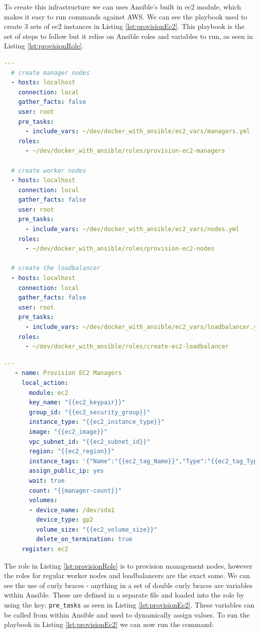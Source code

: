 \documentclass{article}
\begin{document}
To create this infrastructure we can uses Ansible's built in ec2 module, which makes it easy to run commands against AWS. We can see the playbook used to create 3 sets of ec2 instances in Listing \ref{lst:provisionEc2}. This playbook is the set of steps to follow but it relies on Ansible roles and variables to run, as seen in Listing \ref{lst:provisionRole}.

\begin{lstlisting}[float,floatplacement=!htbp,language=yaml,caption={create-instances.yml},label={lst:provisionEc2},basicstyle=\scriptsize]
  ---
  # create manager nodes 
  - hosts: localhost
    connection: local
    gather_facts: false
    user: root
    pre_tasks:
      - include_vars: ~/dev/docker_with_ansible/ec2_vars/managers.yml
    roles:
      - ~/dev/docker_with_ansible/roles/provision-ec2-managers

  # create worker nodes
  - hosts: localhost
    connection: local
    gather_facts: false
    user: root
    pre_tasks:
      - include_vars: ~/dev/docker_with_ansible/ec2_vars/nodes.yml
    roles:
      - ~/dev/docker_with_ansible/roles/provision-ec2-nodes
      
  # create the loadbalancer
  - hosts: localhost
    connection: local
    gather_facts: false
    user: root
    pre_tasks:
      - include_vars: ~/dev/docker_with_ansible/ec2_vars/loadbalancer.yml
    roles:
      - ~/dev/docker_with_ansible/roles/create-ec2-loadbalancer
\end{lstlisting}
 
\begin{lstlisting}[float,floatplacement=!htbp,language=yaml,caption={provision-ec2-managers.yml},label={lst:provisionRole},basicstyle=\scriptsize]
  ---
   - name: Provision EC2 Managers
     local_action:
       module: ec2
       key_name: "{{ec2_keypair}}"
       group_id: "{{ec2_security_group}}"
       instance_type: "{{ec2_instance_type}}"
       image: "{{ec2_image}}"
       vpc_subnet_id: "{{ec2_subnet_id}}"
       region: "{{ec2_region}}"
       instance_tags: '{"Name":"{{ec2_tag_Name}}","Type":"{{ec2_tag_Type}}"}'
       assign_public_ip: yes
       wait: true
       count: "{{manager-count}}"
       volumes: 
       - device_name: /dev/sda1
         device_type: gp2
         volume_size: "{{ec2_volume_size}}"
         delete_on_termination: true
     register: ec2
\end{lstlisting}

The role in Listing \ref{lst:provisionRole} is to provision management nodes, however the roles for regular worker nodes and loadbalancers are the exact same. We can see the use of curly braces - anything in a set of double curly braces are variables within Ansible. These are defined in a separate file and loaded into the role by using the key: \texttt{pre\_tasks} as seen in Listing \ref{lst:provisionEc2}. These variables can be called from within Ansible and used to dynamically assign values. To run the playbook in Listing \ref{lst:provisionEc2} we can now run the command:
\end{document}

